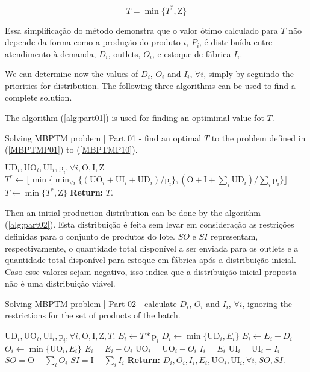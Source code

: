 \documentclass[authoryear,manuscript,12pt]{elsarticle}
\begin{document}
\begin{equation}
T = \min \{T^* , \textrm{Z}\}
\end{equation}

Essa simplificação do método demonstra que o valor ótimo calculado para $T$ não depende da forma como a produção do produto $i$, $P_i$, é distribuída entre atendimento à demanda, $D_i$, outlets, $O_i$, e estoque de fábrica $I_i$. 

We can determine now the values of $D_i$, $O_i$ and $I_i$, $\forall i$, simply by seguindo the priorities for distribution. The following three algorithms can be used to find a complete solution.

The algorithm (\ref{alg:part01}) is used for finding an optimimal value fot $T$.

\begin{algorithm}
\caption{Solving MBPTM problem | Part 01 - find an optimal $T$ to the problem defined in (\ref{MBPTMP01}) to (\ref{MBPTMP10}).}\label{alg:part01}
\begin{algorithmic}
	\Require $\textrm{UD}_i, \textrm{UO}_i, \textrm{UI}_i, \textrm{p}_i, \forall i, \textrm{O}, \textrm{I}, \textrm{Z}$
	\State $T^* \gets \lfloor{\min \{\min_{\forall i} \{(\textrm{UO}_i + \textrm{UI}_i + \textrm{UD}_i) / \textrm{p}_i\},(\textrm{O} + \textrm{I} + \sum_i \textrm{UD}_i) / \sum_i {\textrm{p}_i}\}}\rfloor$
	\State $T \gets \min \{T^* , \textrm{Z}\}$
\State \textbf{Return:} $T$.
\end{algorithmic}
\end{algorithm}

Then an initial production distribution can be done by the algorithm (\ref{alg:part02}). Esta distribuição é feita sem levar em consideração as restrições definidas para o conjunto de produtos do lote. $SO$ e $SI$ representam, respectivamente, o quantidade total disponível a ser enviada para os outlets e a quantidade total disponível para estoque em fábrica após a distribuição inicial. Caso esse valores sejam negativo, isso indica que a distribuição inicial proposta não é uma distribuição viável.

\begin{algorithm}
\caption{Solving MBPTM problem | Part 02 - calculate $D_i$, $O_i$ and $I_i$, $\forall i$, ignoring the restrictions for the set of products of the batch.}\label{alg:part02}
\begin{algorithmic}
	\Require $\textrm{UD}_i, \textrm{UO}_i, \textrm{UI}_i, \textrm{p}_i, \forall i, \textrm{O}, \textrm{I}, \textrm{Z}, T$.
		\State $E_i \gets T * \textrm{p}_i$
		\State $D_i \gets \min \{\textrm{UD}_i, E_i\}$
		\State $E_i \gets E_i - D_i$
		\State $O_i \gets \min \{\textrm{UO}_i, E_i\}$
		\State $E_i = E_i - O_i$
		\State $\textrm{UO}_i = \textrm{UO}_i - O_i$
		\State $I_i = E_i$
		\State $\textrm{UI}_i = \textrm{UI}_i - I_i$
	\EndFor
	\State $SO = \textrm{O} - \sum_i{O_i}$
	\State $SI = \textrm{I} - \sum_i{I_i}$
	\State \textbf{Return:} $D_i, O_i, I_i, E_i, \textrm{UO}_i, \textrm{UI}_i, \forall i, SO, SI$.
\end{algorithmic}
\end{algorithm}
\end{document}
